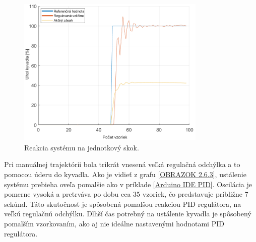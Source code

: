\begin{figure}[!tbh]
	\centering
	\includegraphics[width=90mm]{obr/jednotkovyskoskMAt.png}
	\caption{Reakcia systému na jednotkový skok.}\label{OBRAZOK 2.6.1}
\end{figure}

Pri manuálnej trajektórii bola trikrát vnesená veľká regulačná odchýlka a to pomocou úderu do kyvadla. Ako je vidieť z grafu \ref{OBRAZOK 2.6.3}, ustálenie systému prebieha oveľa pomalšie ako v príklade \ref{Arduino IDE PID}. Oscilácia je pomerne vysoká a pretrváva po dobu cca 35 vzoriek, čo predstavuje približne 7 sekúnd. Táto skutočnosť je spôsobená pomalšou reakciou PID regulátora, na veľkú regulačnú odchýlku. Dlhší čas potrebný na ustálenie kyvadla je spôsobený pomalším vzorkovaním, ako aj nie ideálne nastavenými hodnotami PID regulátora.  
\vspace{6cm}

